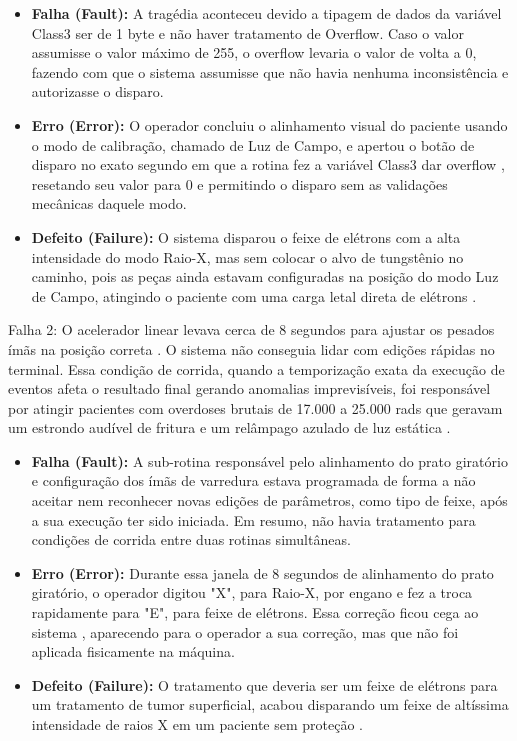 \documentclass[12pt,a4paper]{article}
\begin{document}
\begin{itemize}
    \item \textbf{Falha (Fault):} A tragédia aconteceu devido a tipagem de dados da variável Class3 ser de 1 byte e não haver tratamento de Overflow. Caso o valor assumisse o valor máximo de 255, o overflow levaria o valor de volta a 0, fazendo com que o sistema assumisse que não havia nenhuma inconsistência e autorizasse o disparo.
    \item \textbf{Erro (Error):} O operador concluiu o alinhamento visual do paciente usando o modo de calibração, chamado de Luz de Campo, e apertou o botão de disparo no exato segundo em que a rotina fez a variável Class3 dar overflow \cite{medium_overflow}, resetando seu valor para 0 e permitindo o disparo sem as validações mecânicas daquele modo.
    \item \textbf{Defeito (Failure):} O sistema disparou o feixe de elétrons com a alta intensidade do modo Raio-X, mas sem colocar o alvo de tungstênio no caminho, pois as peças ainda estavam configuradas na posição do modo Luz de Campo, atingindo o paciente com uma carga letal direta de elétrons \cite{harvard_investigation}.
\end{itemize}

Falha 2:
O acelerador linear levava cerca de 8 segundos para ajustar os pesados ímãs na posição correta \cite{mit_investigation}. O sistema não conseguia lidar com edições rápidas no terminal. Essa condição de corrida, quando a temporização exata da execução de eventos afeta o resultado final gerando anomalias imprevisíveis, foi responsável por atingir pacientes com overdoses brutais de 17.000 a 25.000 rads que geravam um estrondo audível de fritura e um relâmpago azulado de luz estática \cite{harvard_investigation, smartbear_race}.

\begin{itemize}
    \item \textbf{Falha (Fault):} A sub-rotina responsável pelo alinhamento do prato giratório e configuração dos ímãs de varredura estava programada de forma a não aceitar nem reconhecer novas edições de parâmetros, como tipo de feixe, após a sua execução ter sido iniciada. Em resumo, não havia tratamento para condições de corrida entre duas rotinas simultâneas.
    \item \textbf{Erro (Error):} Durante essa janela de 8 segundos de alinhamento do prato giratório, o operador digitou "X", para Raio-X, por engano e fez a troca rapidamente para "E", para feixe de elétrons. Essa correção ficou cega ao sistema \cite{mit_investigation}, aparecendo para o operador a sua correção, mas que não foi aplicada fisicamente na máquina.
    \item \textbf{Defeito (Failure):} O tratamento que deveria ser um feixe de elétrons para um tratamento de tumor superficial, acabou disparando um feixe de altíssima intensidade de raios X em um paciente sem proteção \cite{harvard_investigation}.
\end{itemize}
\end{document}
